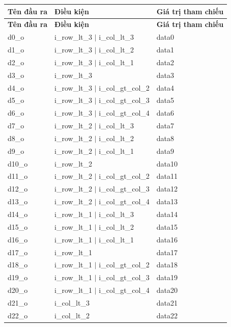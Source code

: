 \renewcommand{\arraystretch}{1}
\begin{longtable}{|p{3cm}|p{8cm}|p{4cm}|}
	\hline
	\rowcolor{gray!30}
	\textbf{Tên đầu ra} & \textbf{Điều kiện} & \textbf{Giá trị tham chiếu} \\
	\hline
	\endfirsthead
	
	\hline
	\rowcolor{gray!30}
	\textbf{Tên đầu ra} & \textbf{Điều kiện} & \textbf{Giá trị tham chiếu} \\
	\hline
	\endhead
	d0\_o & i\_row\_lt\_3 $\vert$ i\_col\_lt\_3 & data0 \\
	d1\_o & i\_row\_lt\_3 $\vert$ i\_col\_lt\_2 & data1 \\
	d2\_o & i\_row\_lt\_3 $\vert$ i\_col\_lt\_1 & data2 \\
	d3\_o & i\_row\_lt\_3 & data3 \\
	d4\_o & i\_row\_lt\_3 $\vert$ i\_col\_gt\_col\_2 & data4 \\
	d5\_o & i\_row\_lt\_3 $\vert$ i\_col\_gt\_col\_3 & data5 \\
	d6\_o & i\_row\_lt\_3 $\vert$ i\_col\_gt\_col\_4 & data6 \\
	d7\_o & i\_row\_lt\_2 $\vert$ i\_col\_lt\_3 & data7 \\
	d8\_o & i\_row\_lt\_2 $\vert$ i\_col\_lt\_2 & data8 \\
	d9\_o & i\_row\_lt\_2 $\vert$ i\_col\_lt\_1 & data9 \\
	d10\_o & i\_row\_lt\_2 & data10 \\
	d11\_o & i\_row\_lt\_2 $\vert$ i\_col\_gt\_col\_2 & data11 \\
	d12\_o & i\_row\_lt\_2 $\vert$ i\_col\_gt\_col\_3 & data12 \\
	d13\_o & i\_row\_lt\_2 $\vert$ i\_col\_gt\_col\_4 & data13 \\
	d14\_o & i\_row\_lt\_1 $\vert$ i\_col\_lt\_3 & data14 \\
	d15\_o & i\_row\_lt\_1 $\vert$ i\_col\_lt\_2 & data15 \\
	d16\_o & i\_row\_lt\_1 $\vert$ i\_col\_lt\_1 & data16 \\
	d17\_o & i\_row\_lt\_1 & data17 \\
	d18\_o & i\_row\_lt\_1 $\vert$ i\_col\_gt\_col\_2 & data18 \\
	d19\_o & i\_row\_lt\_1 $\vert$ i\_col\_gt\_col\_3 & data19 \\
	d20\_o & i\_row\_lt\_1 $\vert$ i\_col\_gt\_col\_4 & data20 \\
	d21\_o & i\_col\_lt\_3 & data21 \\
	d22\_o & i\_col\_lt\_2 & data22 \\

\end{longtable}

